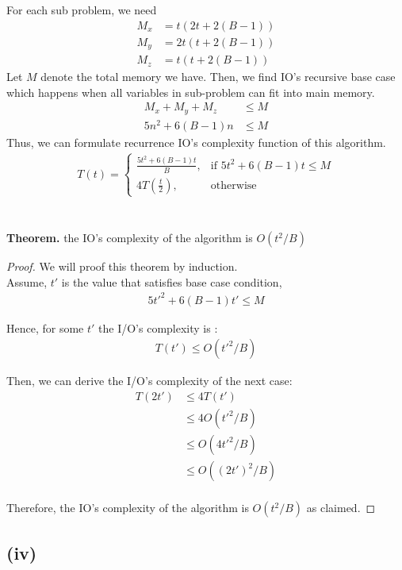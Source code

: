 For each sub problem, we need
\begin{align*}
	M_x &= t(2t + 2(B-1)) \\
	M_y &= 2t(t+2(B-1))\\
	M_z &= t(t+2(B-1))
\end{align*}
Let $M$ denote the total memory we have. Then, we find IO's recursive base case which happens when all variables in sub-problem can fit into main memory.
\begin{align*}
M_x + M_y + M_z &\leq M \\
5n^2 + 6(B-1)n &\leq M
\end{align*}
Thus, we can formulate recurrence IO's complexity function of this algorithm.
\begin{align*}
	T(t) = \begin{cases}
	    \frac{5t^2 + 6(B-1)t}{B},& \text{if } 5t^2 + 6(B-1)t \leq M\\
	    4T(\frac{t}{2}),              & \text{otherwise}
	\end{cases}
\end{align*}
\\
\\
\textbf{Theorem.} the IO's complexity of the algorithm is $O(t^2/B)$
\begin{proof}
We will proof this theorem by induction.\\

Assume, $t'$ is the value that satisfies base case condition, 
\begin{align*}
	5t'^{2} + 6(B-1)t' \leq M
\end{align*}

Hence, for some $t'$ the I/O's complexity is :
\begin{align*}
	T(t') \leq O(t'^2/B)
\end{align*}

Then, we can derive the I/O's complexity of the next case:
\begin{align*}
	T(2t') &\leq 4T(t') \\
	&\leq 4 O(t'^2/B) \\
	&\leq O( 4t'^2/B ) \\
	&\leq O( (2t')^2/B ) \\
\end{align*}

Therefore, the IO's complexity of the algorithm is $O(t^2/B)$ as claimed.
\end{proof}


\subsection*{(iv)}

